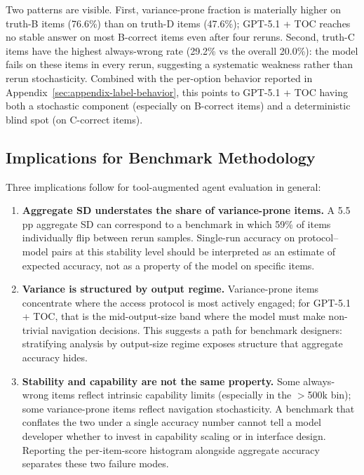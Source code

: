 \documentclass{article}
\begin{document}
Two patterns are visible. First, variance-prone fraction is materially higher on truth-B items (76.6\%) than on truth-D items (47.6\%); GPT-5.1 + TOC reaches no stable answer on most B-correct items even after four reruns. Second, truth-C items have the highest always-wrong rate (29.2\% vs the overall 20.0\%): the model fails on these items in every rerun, suggesting a systematic weakness rather than rerun stochasticity. Combined with the per-option behavior reported in Appendix~\ref{sec:appendix-label-behavior}, this points to GPT-5.1 + TOC having both a stochastic component (especially on B-correct items) and a deterministic blind spot (on C-correct items).

\subsection{Implications for Benchmark Methodology}

Three implications follow for tool-augmented agent evaluation in general:

\begin{enumerate}[leftmargin=*, itemsep=2pt]
    \item \textbf{Aggregate SD understates the share of variance-prone items.} A 5.5\,pp aggregate SD can correspond to a benchmark in which 59\% of items individually flip between rerun samples. Single-run accuracy on protocol--model pairs at this stability level should be interpreted as an estimate of expected accuracy, not as a property of the model on specific items.
    \item \textbf{Variance is structured by output regime.} Variance-prone items concentrate where the access protocol is most actively engaged; for GPT-5.1 + TOC, that is the mid-output-size band where the model must make non-trivial navigation decisions. This suggests a path for benchmark designers: stratifying analysis by output-size regime exposes structure that aggregate accuracy hides.
    \item \textbf{Stability and capability are not the same property.} Some always-wrong items reflect intrinsic capability limits (especially in the $>$500k bin); some variance-prone items reflect navigation stochasticity. A benchmark that conflates the two under a single accuracy number cannot tell a model developer whether to invest in capability scaling or in interface design. Reporting the per-item-score histogram alongside aggregate accuracy separates these two failure modes.
\end{enumerate}
\end{document}

